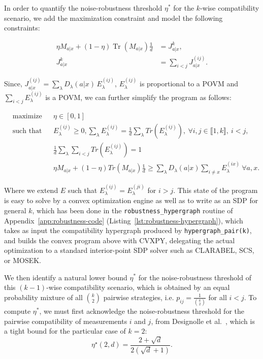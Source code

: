 \documentclass[oneside, a4paper, onecolumn, 11pt]{article}
\theoremstyle{definition}
\theoremstyle{plain}
\theoremstyle{remark}
\begin{document}
In order to quantify the noise-robustness threshold $\eta^*$ for the $k$-wise compatibility scenario, we 
add the maximization constraint and model the following constraints:
\begin{center}
  \begin{equation}
    \begin{aligned}
\eta M_{a|x} + (1-\eta)\operatorname{Tr}(M_{a|x}) \frac{\mathds{1}}{d} &= J^k_{a|x}, \\
J^k_{a|x} &= \sum_{i<j} J_{a|x}^{(ij)}.
\end{aligned}
  \end{equation}
\end{center}

Since, $J_{a|x}^{(ij)} = \sum_\lambda D_\lambda(a|x)\, E_\lambda^{(ij)}$, $E_\lambda^{(ij)}$ is proportional to a POVM and $\sum_{i < j}E_\lambda^{(ij)} $ is a POVM,
we can further simplify the program as follows:
\begin{center}
\begin{align*}
&\text{maximize} & & \eta \in [0,1] \\
&\text{such that} & & E_\lambda^{(ij)} \geq 0, \sum_\lambda E_\lambda^{(ij)} = \frac{\mathds{1}}{d} \sum_\lambda Tr(E_\lambda^{(ij)}),\ \forall i,j \in \llbracket 1,k \rrbracket,\ i<j, \\
& & & \frac{1}{d} \sum_\lambda \sum_{i < j} Tr(E_\lambda^{(ij)}) = 1 \\ 
 & & & \eta M_{a|x} + (1-\eta) Tr(M_{a|x}) \frac{\mathds{1}}{d} \geq \sum_\lambda D_\lambda(a|x) \sum_{i \neq x} E_\lambda^{(ix)}\ \forall a,x.
\end{align*}
\end{center}

Where we extend $E$ such that $E_\lambda^{(ij)} = E_\lambda^{(ji)}$ for $i > j$.
\newline This state of the program is easy to solve by a convex optimization engine as well as to write as an SDP for general $k$, which has been done in the \texttt{robustness\_hypergraph} routine of Appendix~\ref{app:robustness-code} (Listing~\ref{lst:robustness-hypergraph}), which takes as input the compatibility hypergraph produced by \texttt{hypergraph\_pair(k)}, and builds the convex program above with CVXPY, delegating the actual optimization to a standard interior-point SDP solver such as CLARABEL, SCS, or MOSEK.

We then identify a natural lower bound $\eta^*$ for the noise-robustness threshold of this $(k-1)$-wise compatibility scenario, 
which is obtained by an equal probability mixture of all $\binom{k}{2}$ pairwise strategies, i.e. $p_{ij} = \frac{1}{\binom{k}{2}}$ for all $i < j$.
To compute $\eta^*$, we must first acknowledge the noise-robustness threshold for the pairwise compatibility of measurements $i$ and $j$, from 
Designolle et al.~\cite{Designolle2019}, which is a tight bound for the particular case of $k = 2$:
\begin{equation}
  \eta^{\star}(2, d) = \frac{2 + \sqrt{d}}{2(\sqrt{d} + 1)}.
  \label{eq:designolle-k2}
\end{equation}
\end{document}
